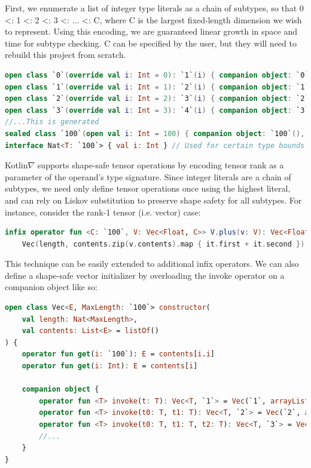 \documentclass[12pt,initial,twoside,maitrise]{dms}
\numberwithin{equation}{section}
\numberwithin{table}{chapter}
\numberwithin{figure}{chapter}
\begin{document}
First, we enumerate a list of integer type literals as a chain of subtypes, so that 0 <: 1 <: 2 <: 3 <: ... <: C, where C is the largest fixed-length dimension we wish to represent. Using this encoding, we are guaranteed linear growth in space and time for subtype checking. C can be specified by the user, but they will need to rebuild this project from scratch.

\begin{lstlisting}[caption={Simple code listing.}, language=Kotlin]
open class `0`(override val i: Int = 0): `1`(i) { companion object: `0`(), Nat<`0`> }
open class `1`(override val i: Int = 1): `2`(i) { companion object: `1`(), Nat<`1`> }
open class `2`(override val i: Int = 2): `3`(i) { companion object: `2`(), Nat<`2`> }
open class `3`(override val i: Int = 3): `4`(i) { companion object: `3`(), Nat<`3`> }
//...This is generated
sealed class `100`(open val i: Int = 100) { companion object: `100`(), Nat<`100`> }
interface Nat<T: `100`> { val i: Int } // Used for certain type bounds
\end{lstlisting}

Kotlin$\nabla$ supports shape-safe tensor operations by encoding tensor rank as a parameter of the operand’s type signature. Since integer literals are a chain of subtypes, we need only define tensor operations once using the highest literal, and can rely on Liskov substitution to preserve shape safety for all subtypes. For instance, consider the rank-1 tensor (i.e. vector) case:

\begin{lstlisting}[caption={Simple code listing.}, language=Kotlin]
infix operator fun <C: `100`, V: Vec<Float, C>> V.plus(v: V): Vec<Float, C> =
    Vec(length, contents.zip(v.contents).map { it.first + it.second })
\end{lstlisting}

This technique can be easily extended to additional infix operators. We can also define a shape-safe vector initializer by overloading the invoke operator on a companion object like so:

\begin{lstlisting}[caption={Simple code listing.}, language=Kotlin]
open class Vec<E, MaxLength: `100`> constructor(
    val length: Nat<MaxLength>,
    val contents: List<E> = listOf()
) {
    operator fun get(i: `100`): E = contents[i.i]
    operator fun get(i: Int): E = contents[i]

    companion object {
        operator fun <T> invoke(t: T): Vec<T, `1`> = Vec(`1`, arrayListOf(t))
        operator fun <T> invoke(t0: T, t1: T): Vec<T, `2`> = Vec(`2`, arrayListOf(t0, t1))
        operator fun <T> invoke(t0: T, t1: T, t2: T): Vec<T, `3`> = Vec(`3`, arrayListOf(t0, t1, t2))
        //...
    }
}
\end{lstlisting}
\end{document}
